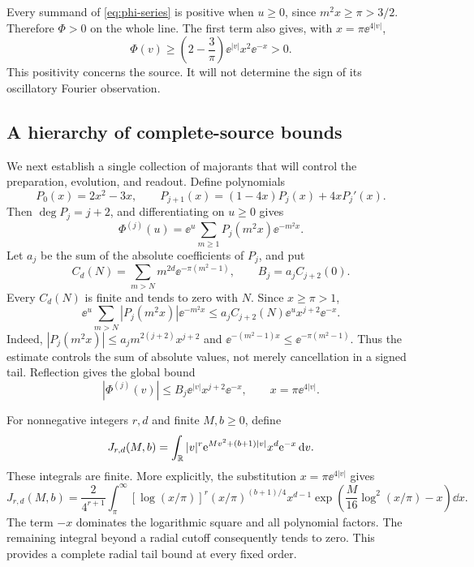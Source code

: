 Every summand of \eqref{eq:phi-series} is positive when $u\ge0$, since
$m^2x\ge\pi>3/2$. Therefore $\Phi>0$ on the whole line. The first term
also gives, with $x=\pi\ee^{4|v|}$,
\begin{equation}
 \Phi(v)\ge\left(2-\frac3\pi\right)
 \ee^{|v|}x^2\ee^{-x}>0.
 \label{eq:phi-lower}
\end{equation}
This positivity concerns the source. It will not determine the sign of
its oscillatory Fourier observation.

\subsection{A hierarchy of complete-source bounds}

We next establish a single collection of majorants that will control the
preparation, evolution, and readout. Define polynomials
\begin{equation}
 P_0(x)=2x^2-3x,\qquad
 P_{j+1}(x)=(1-4x)P_j(x)+4xP_j'(x).
 \label{eq:source-poly}
\end{equation}
Then $\deg P_j=j+2$, and differentiating on $u\ge0$ gives
\begin{equation}
 \Phi^{(j)}(u)=\ee^u\sum_{m\ge1}
                 P_j(m^2x)\ee^{-m^2x}.
 \label{eq:phi-derivatives}
\end{equation}
Let $a_j$ be the sum of the absolute coefficients of $P_j$, and put
\begin{equation}
 C_d(N)=\sum_{m>N}m^{2d}\ee^{-\pi(m^2-1)},\qquad
 B_j=a_jC_{j+2}(0).
 \label{eq:source-constants}
\end{equation}
Every $C_d(N)$ is finite and tends to zero with $N$. Since $x\ge\pi>1$,
\begin{equation}
 \ee^u\sum_{m>N}|P_j(m^2x)|\ee^{-m^2x}
 \le a_j C_{j+2}(N)\ee^u x^{j+2}\ee^{-x}.
 \label{eq:source-tail}
\end{equation}
Indeed, $|P_j(m^2x)|\le a_jm^{2(j+2)}x^{j+2}$ and
$\ee^{-(m^2-1)x}\le\ee^{-\pi(m^2-1)}$. Thus the estimate controls
the sum of absolute values, not merely cancellation in a signed tail.
Reflection gives the global bound
\begin{equation}
 |\Phi^{(j)}(v)|\le B_j\ee^{|v|}x^{j+2}\ee^{-x},
 \qquad x=\pi\ee^{4|v|}.
 \label{eq:phi-global}
\end{equation}

For nonnegative integers $r,d$ and finite $M,b\ge0$, define
\begin{equation}
 J_{r,d}(M,b)=\int_\mathbb R |v|^r
 \mathrm e^{Mv^2+(b+1)|v|}x^d\mathrm e^{-x}\,\mathrm d v.
 \label{eq:J-definition}
\end{equation}
These integrals are finite. More explicitly, the substitution
$x=\pi\ee^{4|v|}$ gives
\begin{equation}
 J_{r,d}(M,b)=\frac{2}{4^{r+1}}\int_\pi^\infty
 [\log(x/\pi)]^r(x/\pi)^{(b+1)/4}x^{d-1}
 \exp\!\left(\frac{M}{16}\log^2(x/\pi)-x\right)\dd x.
 \label{eq:J-integral}
\end{equation}
The term $-x$ dominates the logarithmic square and all polynomial factors.
The remaining integral beyond a radial cutoff consequently tends to
zero. This provides a complete radial tail bound at every fixed order.

